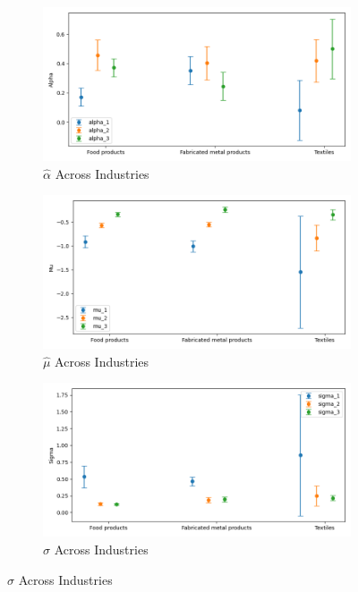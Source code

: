 \documentclass{article}
\begin{document}
\begin{figure}[ht!]
    \centering 
    \caption{Stationary Normal Model Across Industries}
    \begin{subfigure}[t]{0.32\textwidth}
        \centering
        \includegraphics[width=\textwidth]{figure/stationary_normal_alpha_across_industries_m3.png}
        \caption{$\hat\alpha$ Across Industries}
    \end{subfigure}
    \begin{subfigure}[t]{0.32\textwidth}
        \centering
        \includegraphics[width=\textwidth]{figure/stationary_normal_mu_across_industries_m3.png}
        \caption{$\hat\mu$ Across Industries}
    \end{subfigure}
    \begin{subfigure}[t]{0.32\textwidth}
        \centering
        \includegraphics[width=\textwidth]{figure/stationary_normal_sigma_across_industries_m3.png}
        \caption{$\hat\sigma$ Across Industries}
    \end{subfigure}
\end{figure}
\end{document}
